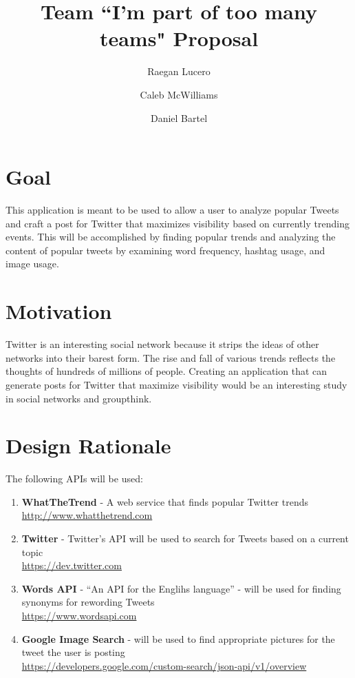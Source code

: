 \documentclass{article}
\title{Team ``I'm part of too many teams" Proposal}
\date{}
\author{
	Raegan Lucero
	\and
	 Caleb McWilliams
	\and
	 Daniel Bartel
 }
\begin{document}
\maketitle

\section*{Goal}

This application is meant to be used to allow a user to analyze popular Tweets and craft a post for Twitter that maximizes visibility 
based on currently trending events. This will be accomplished by finding popular trends and analyzing the content of popular tweets by examining word frequency, hashtag usage, and image usage. 

\section*{Motivation}

Twitter is an interesting social network because it strips the ideas of other networks into their barest form.
The rise and fall of various trends reflects the thoughts of hundreds of millions of people.
Creating an application that can generate posts for Twitter that maximize visibility would be an interesting study in 
social networks and groupthink.

\section*{Design Rationale}

The following APIs will be used:
\begin{enumerate}
  \item[\textbullet] \textbf{WhatTheTrend} - A web service that finds popular Twitter trends \\
    \url{http://www.whatthetrend.com}
  \item[\textbullet] \textbf{Twitter} - Twitter's API will be used to search for Tweets based on a current topic \\
    \url{https://dev.twitter.com}
  \item[\textbullet] \textbf{Words API} - ``An API for the Englihs language'' - will be used for finding synonyms for rewording Tweets \\ 
    \url{https://www.wordsapi.com}
  \item[\textbullet] \textbf{Google Image Search} - will be used to find appropriate pictures for the tweet the user is posting \\
    \url{https://developers.google.com/custom-search/json-api/v1/overview}
\end{enumerate}
	
\end{document}
